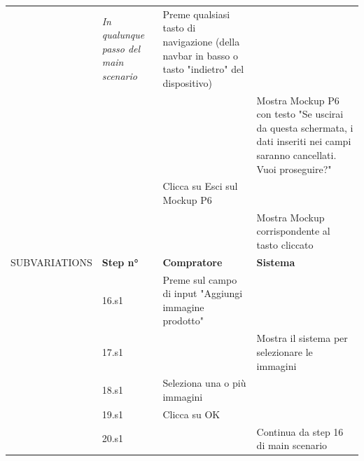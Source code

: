 \begin{longtable}{|C{3.0cm}|C{1.3cm}|L{5.2cm}|L{5.2cm}|}
                        & \textit{In qualunque passo del main scenario}
                        & Preme qualsiasi tasto di navigazione (della navbar in basso o tasto "indietro" del dispositivo)
                        & \\
                        & 
                        & 
                        & Mostra Mockup P6 con testo "Se uscirai da questa schermata, i dati inseriti nei campi saranno cancellati. Vuoi proseguire?" \\
                        & 
                        & Clicca su Esci sul Mockup P6
                        & \\
                        & 
                        & 
                        & Mostra Mockup corrispondente al tasto cliccato\\
                \hline
                    SUBVARIATIONS
                    & \textbf{Step n°} 
                    & \textbf{Compratore} 
                    & \textbf{Sistema}\\
                \hline
                        & 16.s1
                        & Preme sul campo di input "Aggiungi immagine prodotto"
                        & \\
                        & 17.s1
                        & 
                        & Mostra il sistema per selezionare le immagini\\
                        & 18.s1
                        & Seleziona una o più immagini
                        & \\
                        & 19.s1
                        & Clicca su OK
                        & \\
                        & 20.s1
                        & 
                        & Continua da step 16 di main scenario\\
                \hline
            \end{longtable}

        \newpage

